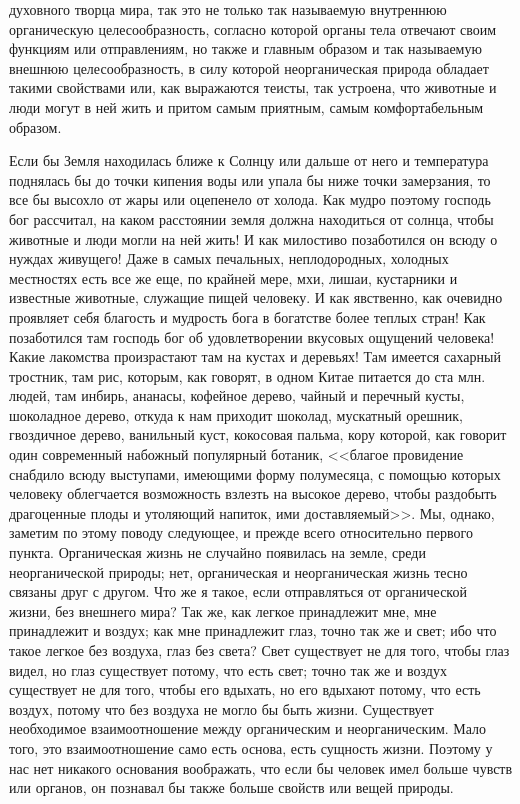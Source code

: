 \documentclass[12pt]{article}
\begin{document}
духовного творца мира, так это не только так называемую внутреннюю органическую целесообразность, согласно которой органы тела отвечают своим функциям или отправлениям, но также и главным образом и так называемую внешнюю целесообразность, в силу которой неорганическая природа обладает такими свойствами или, как выражаются теисты, так устроена, что животные и люди могут в ней жить и притом самым приятным, самым комфортабельным образом. 

Если бы Земля находилась ближе к Солнцу или дальше от него и температура поднялась бы до точки кипения воды или упала бы ниже точки замерзания, то все бы высохло от жары или оцепенело от холода. Как мудро поэтому господь бог рассчитал, на каком расстоянии земля должна находиться от солнца, чтобы животные и люди могли на ней жить! И как милостиво позаботился он всюду о нуждах живущего! Даже в самых печальных, неплодородных, холодных местностях есть все же еще, по крайней мере, мхи, лишаи, кустарники и известные животные, служащие пищей человеку. И как явственно, как очевидно проявляет себя благость и мудрость бога в богатстве более теплых стран! Как позаботился там господь бог об удовлетворении вкусовых ощущений человека! Какие лакомства произрастают там на кустах и деревьях! Там имеется сахарный тростник, там рис, которым, как говорят, в одном Китае питается до ста млн. людей, там инбирь, ананасы, кофейное дерево, чайный и перечный кусты, шоколадное дерево, откуда к нам приходит шоколад, мускатный орешник, гвоздичное дерево, ванильный куст, кокосовая пальма, кору которой, как говорит один современный набожный популярный ботаник, <<благое провидение снабдило всюду выступами, имеющими форму полумесяца, с помощью которых человеку облегчается возможность взлезть на высокое дерево, чтобы раздобыть драгоценные плоды и утоляющий напиток, ими доставляемый>>. Мы, однако, заметим по этому поводу следующее, и прежде всего относительно первого пункта. Органическая жизнь не случайно появилась на земле, среди неорганической природы; нет, органическая и неорганическая жизнь тесно связаны друг с другом. Что же я такое, если отправляться от органической жизни, без внешнего мира? Так же, как легкое принадлежит мне, мне принадлежит и воздух; как мне принадлежит глаз, точно так же и свет; ибо что такое легкое без воздуха, глаз без света? Свет существует не для того, чтобы глаз видел, но глаз существует потому, что есть свет; точно так же и воздух существует не для того, чтобы его вдыхать, но его вдыхают потому, что есть воздух, потому что без воздуха не могло бы быть жизни. Существует необходимое взаимоотношение между органическим и неорганическим. Мало того, это взаимоотношение само есть основа, есть сущность жизни. Поэтому у нас нет никакого основания воображать, что если бы человек имел больше чувств или органов, он познавал бы также больше свойств или вещей природы. 
\end{document}
